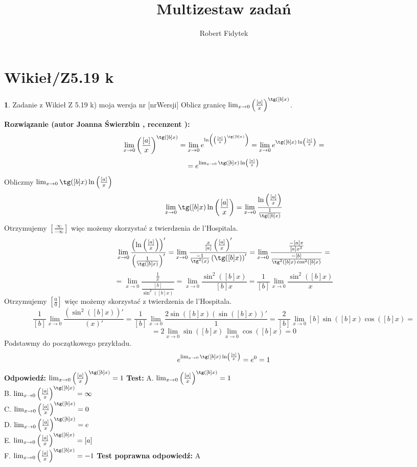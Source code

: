 \documentclass[12pt, a4paper]{article}
\title{Multizestaw zadań}
\author{Robert Fidytek}
\date{}
\theoremstyle{definition} %
\newtheorem{zad}{}
\newcommand{\kategoria}[1]{\section{#1}} %
\newcommand{\zadStart}[1]{\begin{zad}#1\newline} %
\newcommand{\zadStop}{\end{zad}}   %
\newcommand{\rozwStart}[2]{\noindent \textbf{Rozwiązanie (autor #1 , recenzent #2): }\newline} %
\newcommand{\rozwStop}{\newline}                                            %
\newcommand{\odpStart}{\noindent \textbf{Odpowiedź:}\newline}    %
\newcommand{\odpStop}{\newline}                                             %
\newcommand{\testStart}{\noindent \textbf{Test:}\newline} %
\newcommand{\testStop}{\newline} %
\newcommand{\kluczStart}{\noindent \textbf{Test poprawna odpowiedź:}\newline} %
\newcommand{\kluczStop}{\newline} %
\begin{document}
\maketitle


\kategoria{Wikieł/Z5.19 k}
\zadStart{Zadanie z Wikieł Z 5.19 k) moja wersja nr [nrWersji]}
Oblicz granicę $\lim_{x \rightarrow 0} \left( \frac{[a]}{x} \right)^{\tg([b]x)}$.
\zadStop
\rozwStart{Joanna Świerzbin}{}
$$\lim_{x \rightarrow 0} \left( \frac{[a]}{x} \right)^{\tg([b]x)} = \lim_{x \rightarrow 0} e^{\ln\left(\left( \frac{[a]}{x} \right)^{\tg([b]x)}\right)}
= \lim_{x \rightarrow 0} e^{\tg([b]x)\ln\left( \frac{[a]}{x}\right)}= $$
$$= e^{ \lim_{x \rightarrow 0}\tg([b]x)\ln\left( \frac{[a]}{x}\right)} $$
Obliczmy  $\lim_{x \rightarrow 0}\tg([b]x)\ln\left( \frac{[a]}{x}\right)$
$$\lim_{x \rightarrow 0}\tg([b]x)\ln\left( \frac{[a]}{x}\right) = \lim_{x \rightarrow 0}\frac{\ln\left( \frac{[a]}{x}\right)}{\frac{1}{\tg([b]x)}}$$
Otrzymujemy $ \left[ \frac{\infty}{-\infty} \right] $ więc możemy skorzystać z twierdzenia de l'Hospitala.
$$\lim_{x \rightarrow 0}\frac{\left(\ln\left( \frac{[a]}{x}\right)\right)'}{\left(\frac{1}{\tg([b]x)}\right)'} = 
\lim_{x \rightarrow 0}\frac{\frac{x}{[a]}\left( \frac{[a]}{x}\right)'}{\frac{-1}{\tg^2(x)}\left(\tg([b]x)\right)'} = 
\lim_{x \rightarrow 0}\frac{\frac{-[a]x}{[a]x^2}}{\frac{-[b]}{\tg^2([b]x) \cos^2([b]x)}} =$$
$$ = \lim_{x \rightarrow 0}\frac{\frac{1}{x}}{\frac{[b]}{\sin^2([b]x)}} =
\lim_{x \rightarrow 0}\frac{\sin^2([b]x)}{[b]x}= \frac{1}{[b]}\lim_{x \rightarrow 0}\frac{\sin^2([b]x)}{x} $$
Otrzymujemy $ \left[ \frac{0}{0} \right] $ więc możemy skorzystać z twierdzenia de l'Hospitala.
$$\frac{1}{[b]}\lim_{x \rightarrow 0}\frac{\left(\sin^2([b]x)\right)'}{\left(x\right)'}  = \frac{1}{[b]}\lim_{x \rightarrow 0}\frac{2\sin([b]x)(\sin([b]x))'}{1} = \frac{2}{[b]}\lim_{x \rightarrow 0}[b]\sin([b]x)\cos([b]x)=$$
$$ = 2 \lim_{x \rightarrow 0}\sin([b]x) \lim_{x \rightarrow 0} \cos([b]x)= 0$$
Podstawmy do początkowego przykładu.
$$e^{ \lim_{x \rightarrow 0}\tg([b]x)\ln\left( \frac{[a]}{x}\right)}=e^0=1$$
\rozwStop
\odpStart
$ \lim_{x \rightarrow 0} \left( \frac{[a]}{x} \right)^{\tg([b]x)} =1 $
\odpStop
\testStart
A. $ \lim_{x \rightarrow 0} \left( \frac{[a]}{x} \right)^{\tg([b]x)} =1 $\\
B. $ \lim_{x \rightarrow 0} \left( \frac{[a]}{x} \right)^{\tg([b]x)} =\infty $\\
C. $ \lim_{x \rightarrow 0} \left( \frac{[a]}{x} \right)^{\tg([b]x)} =0 $\\
D. $ \lim_{x \rightarrow 0} \left( \frac{[a]}{x} \right)^{\tg([b]x)} =e $\\
E. $ \lim_{x \rightarrow 0} \left( \frac{[a]}{x} \right)^{\tg([b]x)} =[a] $\\
F. $ \lim_{x \rightarrow 0} \left( \frac{[a]}{x} \right)^{\tg([b]x)} =-1 $
\testStop
\kluczStart
A
\kluczStop
\end{document}
